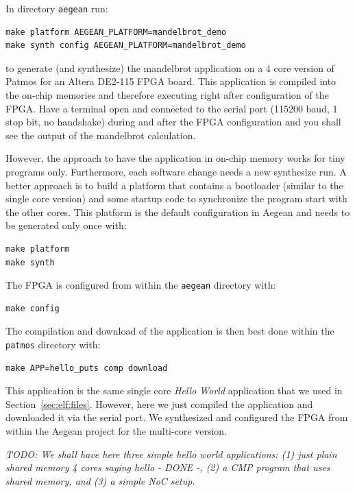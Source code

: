 \documentclass[a4paper,fontsize=10pt,twoside,DIV15,BCOR12mm,headinclude=true,footinclude=false,pagesize,bibtotoc]{scrbook}
\newcommand{\code}[1]{{\texttt{#1}}}
\newcommand{\todo}[1]{{\emph{TODO: #1}}}
\begin{document}
In directory \code{aegean} run:

\begin{verbatim}
make platform AEGEAN_PLATFORM=mandelbrot_demo
make synth config AEGEAN_PLATFORM=mandelbrot_demo
\end{verbatim}

to generate (and synthesize) the mandelbrot application on a 4 core
version of Patmos for an Altera DE2-115 FPGA board. This application is compiled
into the on-chip memories and therefore executing right after configuration of the
FPGA. Have a terminal open and connected to the serial port (115200 baud, 1 stop bit,
no handshake) during and after the FPGA configuration and you shall see the output of
the mandelbrot calculation.

However, the approach to have the application in on-chip memory works for tiny programs
only. Furthermore, each software change needs a new synthesize run. A better approach is
to build a platform that contains a bootloader (similar to the single core version) and some
startup code to synchronize the program start with the other cores. This platform is the default
configuration in Aegean and needs to be generated only once with:

\begin{verbatim}
make platform
make synth
\end{verbatim}

The FPGA is configured from within the \code{aegean} directory with:

\begin{verbatim}
make config
\end{verbatim}

The compilation and download of the application is then best done within
the \code{patmos} directory with:

\begin{verbatim}
make APP=hello_puts comp download
\end{verbatim}

This application is the same single core \emph{Hello World} application that
we used in Section~\ref{sec:elf:files}. However, here we just compiled the
application and downloaded it via the serial port. We synthesized and configured
the FPGA from within the Aegean project for the multi-core version.

\todo{We shall have here three simple hello world applications: (1) just plain shared memory 4 cores saying hello - DONE -,
(2) a CMP program that uses shared memory, and (3) a simple NoC setup.}
\end{document}
